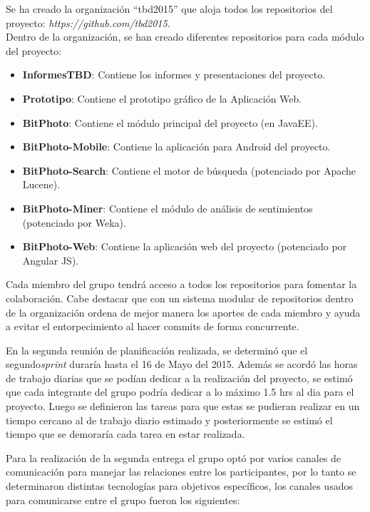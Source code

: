 \documentclass{memoria}
\begin{document}
Se ha creado la organización “tbd2015” que aloja todos los repositorios del proyecto: \textsl{https://github.com/tbd2015}.\\

Dentro de la organización, se han creado diferentes repositorios para cada módulo del proyecto:

\begin{itemize}
	\item \textbf{InformesTBD}: Contiene los informes y presentaciones del proyecto. 
	\item \textbf{Prototipo}: Contiene el prototipo gráfico de la Aplicación Web.
	\item \textbf{BitPhoto}: Contiene el módulo principal del proyecto (en JavaEE).
	\item \textbf{BitPhoto-Mobile}: Contiene la aplicación para Android del proyecto.
	\item \textbf{BitPhoto-Search}: Contiene el motor de búsqueda (potenciado por Apache Lucene).
	\item \textbf{BitPhoto-Miner}: Contiene el módulo de análisis de sentimientos (potenciado por Weka).
	\item \textbf{BitPhoto-Web}: Contiene la aplicación web del proyecto (potenciado por Angular JS).
\end{itemize}

Cada miembro del grupo tendrá acceso a todos los repositorios para fomentar la colaboración. Cabe destacar que con un sistema modular de repositorios dentro de la organización ordena de mejor manera los aportes de cada miembro y ayuda a evitar el entorpecimiento al hacer commits de forma concurrente.

\newpage


En la segunda reunión de planificación realizada, se determinó que el segundo\textsl{sprint} duraría hasta el 16 de Mayo del 2015. Además se acordó las horas de trabajo diarias que se podían dedicar a la realización del proyecto, se estimó que cada integrante del grupo podría dedicar a lo máximo 1.5 hrs al dia para el proyecto. Luego se definieron las tareas para que estas se pudieran realizar en un tiempo cercano al de trabajo diario estimado y posteriormente se estimó el tiempo que se demoraría cada tarea en estar realizada.

Para la realización de la segunda entrega el grupo optó por varios canales de comunicación para manejar las relaciones entre los participantes, por lo tanto se determinaron distintas tecnologías para objetivos específicos, los canales usados para comunicarse entre el grupo fueron los siguientes:
\end{document}
